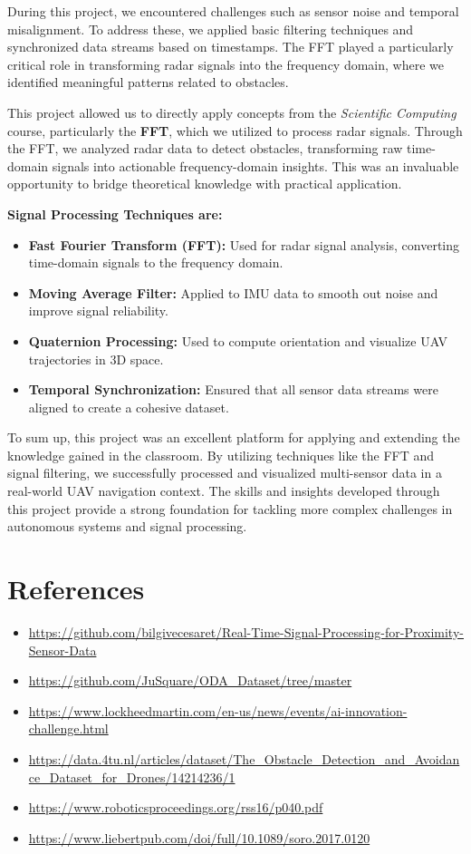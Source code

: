 \documentclass[12pt,a4paper]{article}
\begin{document}
\setlength{\parindent}{1cm} During this project, we encountered challenges such as sensor noise and temporal misalignment. To address these, we applied basic filtering techniques and synchronized data streams based on timestamps. The FFT played a particularly critical role in transforming radar signals into the frequency domain, where we identified meaningful patterns related to obstacles.

\setlength{\parindent}{1cm} This project allowed us to directly apply concepts from the \textit{Scientific Computing} course, particularly the \textbf{FFT}, which we utilized to process radar signals. Through the FFT, we analyzed radar data to detect obstacles, transforming raw time-domain signals into actionable frequency-domain insights. This was an invaluable opportunity to bridge theoretical knowledge with practical application.

\textbf{Signal Processing Techniques are:}
\begin{itemize}
    \item \textbf{Fast Fourier Transform (FFT):} Used for radar signal analysis, converting time-domain signals to the frequency domain.
    \item \textbf{Moving Average Filter:} Applied to IMU data to smooth out noise and improve signal reliability.
    \item \textbf{Quaternion Processing:} Used to compute orientation and visualize UAV trajectories in 3D space.
    \item \textbf{Temporal Synchronization:} Ensured that all sensor data streams were aligned to create a cohesive dataset.
\end{itemize}

To sum up, this project was an excellent platform for applying and extending the knowledge gained in the classroom. By utilizing techniques like the FFT and signal filtering, we successfully processed and visualized multi-sensor data in a real-world UAV navigation context. The skills and insights developed through this project provide a strong foundation for tackling more complex challenges in autonomous systems and signal processing.


\section*{References}
\begin{itemize}
    \item \url{https://github.com/bilgivecesaret/Real-Time-Signal-Processing-for-Proximity-Sensor-Data}
    \item \url{https://github.com/JuSquare/ODA_Dataset/tree/master}
    \item \url{https://www.lockheedmartin.com/en-us/news/events/ai-innovation-challenge.html}
    \item \url{https://data.4tu.nl/articles/dataset/The_Obstacle_Detection_and_Avoidance_Dataset_for_Drones/14214236/1}
    \item  \url{https://www.roboticsproceedings.org/rss16/p040.pdf}
    \item \url{https://www.liebertpub.com/doi/full/10.1089/soro.2017.0120}   
\end{itemize}
\end{document}
